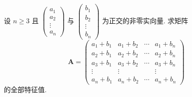 \documentclass[../../main.tex]{subfiles}%
\begin{document}
\begin{example}
设 $n \geqslant 3$ 且 $\begin{pmatrix} a_1 \\ a_2 \\ \vdots \\ a_n \end{pmatrix}$ 与 $\begin{pmatrix} b_1 \\ b_2 \\ \vdots \\ b_n \end{pmatrix}$ 为正交的非零实向量. 求矩阵
$$
\boldsymbol{A} = \begin{pmatrix} a_1 + b_1 & a_1 + b_2 & \cdots & a_1 + b_n \\ a_2 + b_1 & a_2 + b_2 & \cdots & a_2 + b_n \\ a_3 + b_1 & a_3 + b_2 & \cdots & a_3 + b_n \\ \vdots & \vdots & & \vdots \\ a_n + b_1 & a_n + b_2 & \cdots & a_n + b_n \end{pmatrix}
$$
的全部特征值.
\end{example}
\end{document}
